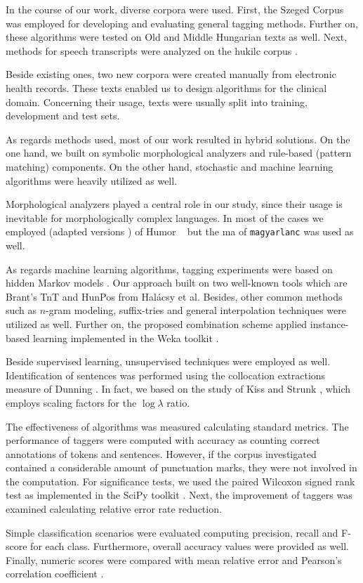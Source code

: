 In the course of our work, diverse corpora were used. 
First, the Szeged Corpus \cite{Csendes2004} was employed for developing and evaluating general tagging methods.
Further on, these algorithms were tested on Old and Middle Hungarian \cite{Novak2013} texts as well.
Next, methods for speech transcripts were analyzed on the \acrshort{hukilc} corpus \cite{Matyus2014}.

Beside existing ones, two new corpora were created manually from electronic health records.
These texts enabled us to design algorithms for the clinical domain.
Concerning their usage, texts were usually split into training, development and test sets.

As regards methods used, most of our work resulted in hybrid solutions.
On the one hand, we built on symbolic morphological analyzers and rule-based (pattern matching) components. 
On the other hand, stochastic and machine learning algorithms were heavily utilized as well.

Morphological analyzers played a central role in our study, since their usage is inevitable for morphologically complex languages.
In most of the cases we employed (adapted versions \cite{Novak2013,NovakOMK,Orosz2013}) of Humor ~\cite{Proszeky1994,Novak2003,Proszeky2005} but the \acrshort{ma} of \texttt{magyarlanc} \cite{zsibrata2013magyarlanc} was used as well.

As regards machine learning algorithms, tagging experiments were based on hidden Markov models \cite{Rabiner1989,Samuelsson1993}. 
Our approach built on two well-known tools which are Brant's TnT \cite{Brants2000} and HunPos \cite{Halacsy2007} from Halácsy et al. 
Besides, other common methods such as $n$-gram modeling, suffix-tries and general interpolation techniques were utilized as well.
Further on, the proposed combination scheme applied instance-based learning \cite{Aha1991} implemented in the Weka toolkit \cite{Hall2009}.

Beside supervised learning, unsupervised techniques were employed as well.
Identification of sentences was performed using the collocation extractions measure of Dunning \cite{dunning1993accurate}.
In fact, we based on the study of Kiss and Strunk \cite{kiss2006unsupervised}, which employs scaling factors for the $\log\lambda$ ratio.

The effectiveness of algorithms was measured calculating standard metrics.
The performance of taggers were computed with accuracy as counting correct annotations of tokens and sentences.
However, if the corpus investigated contained a considerable amount of punctuation marks, they were not involved in the computation.
For significance tests, we used the paired Wilcoxon signed rank test as implemented in the SciPy toolkit \cite{scipy}.
Next, the improvement of taggers was examined calculating relative error rate reduction. 

Simple classification scenarios were evaluated computing precision, recall and F-score for each class.
Furthermore, overall accuracy values were provided as well.
Finally, numeric scores were compared with mean relative error \cite{Witten2011} and Pearson's correlation coefficient \cite{Witten2011}.
